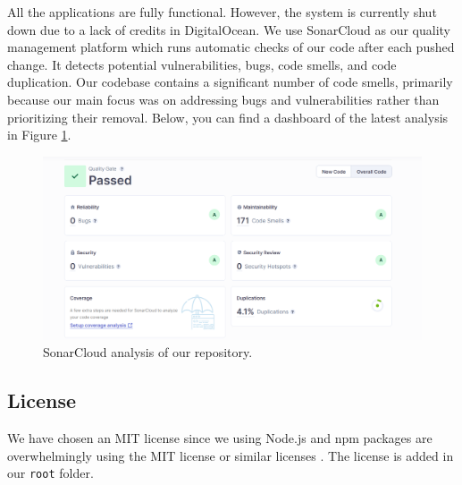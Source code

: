 All the applications are fully functional. However, the system is currently shut down due to a lack of credits in DigitalOcean. We use SonarCloud as our quality management platform which runs automatic checks of our code after each pushed change. It detects potential vulnerabilities, bugs, code smells, and code duplication. Our codebase contains a significant number of code smells, primarily because our main focus was on addressing bugs and vulnerabilities rather than prioritizing their removal. Below, you can find a dashboard of the latest analysis in Figure \ref{fig:sonarCloud}. 

\begin{figure}[H]
    \centering
    \includegraphics[width=\linewidth]{images/SonarCloud.png}
    \caption{SonarCloud analysis of our repository.}
    \label{fig:sonarCloud}
\end{figure}

\subsection{License}
We have chosen an MIT license since we using Node.js and npm packages are overwhelmingly using the MIT license or similar licenses \cite{choosealicense}. The license is added in our \texttt{root} folder. 






